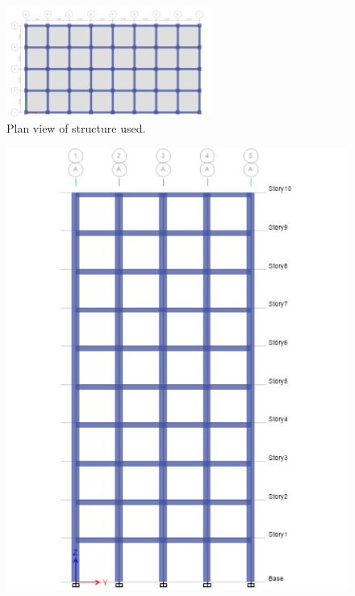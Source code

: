 \documentclass{cup-pan}
\begin{document}
\begin{figure}[H]
\centering
\includegraphics[width=0.6\textwidth]{fig4.png}
\caption{Plan view of structure used.}
\label{fig:plan}
\end{figure}

\begin{figure}[H]
\begin{minipage}{0.4\textwidth}
\includegraphics[width=\linewidth]{fig5.png}
\end{minipage}
\hfill
\begin{minipage}{0.6\textwidth}

\end{minipage}
\end{figure}
\end{document}

